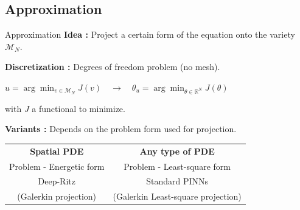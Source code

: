 \subsection{Approximation}

\begin{frame}{Approximation}
	\textbf{Idea :} Project a certain form of the equation onto the variety $\mathcal{M}_N$. \\
	
	\vspace{10pt}
	
	\textbf{Discretization :} Degrees of freedom problem (no mesh).
	\begin{center}
		$u=\arg\min_{v\in \mathcal{M}_N} J(v) \quad \longrightarrow \quad \theta_u=\arg\min_{\theta\in \mathbb{R}^N} J(\theta) $
	\end{center}
	with $J$ a functional to minimize.
	
	\vspace{10pt}
	
	\textbf{Variants :} Depends on the problem form used for projection.
	
	\begin{center}
		\begin{tabular}{c|c}
			\textbf{Spatial PDE} & \textbf{Any type of PDE} \\
			Problem - Energetic form & Problem - Least-square form \\
			Deep-Ritz & Standard PINNs \\
			(Galerkin projection) & (Galerkin Least-square projection)
		\end{tabular}
	\end{center}
\end{frame}


